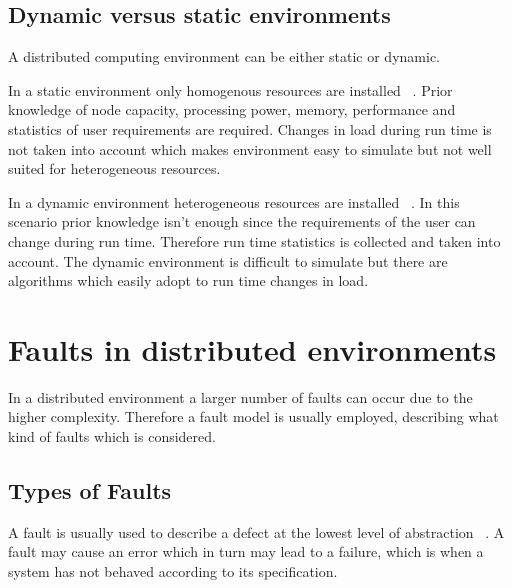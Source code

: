 \documentclass{cslthse-msc}
\begin{document}


\subsection{Dynamic versus static environments} \label{subsec:background_dyn_stat_env}
A distributed computing environment can be either static or dynamic.

In a static environment only homogenous resources are installed ~\cite{compStudyLoadAndCloud}. Prior knowledge of node capacity, processing power, memory, performance and statistics of user requirements are required. Changes in load during run time is not taken into account which makes environment easy to simulate but not well suited for heterogeneous resources.

In a dynamic environment heterogeneous resources are installed ~\cite{compStudyLoadAndCloud}. In this scenario prior knowledge isn't enough since the requirements of the user can change during run time. Therefore run time statistics is collected and taken into account. The dynamic environment is difficult to simulate but there are algorithms which easily adopt to run time changes in load.


\section{Faults in distributed environments} \label{sec:background_faults_distr_env}
In a distributed environment a larger number of faults can occur due to the higher complexity. Therefore a fault model is usually employed, describing what kind of faults which is considered.
\subsection{Types of Faults} \label{subsec:background_types_of_faults}
A fault is usually used to describe a defect at the lowest level of abstraction ~\cite{faultTolerantFundamentals}. A fault may cause an error which in turn may lead to a failure, which is when a system has not behaved according to its specification.
\end{document}
